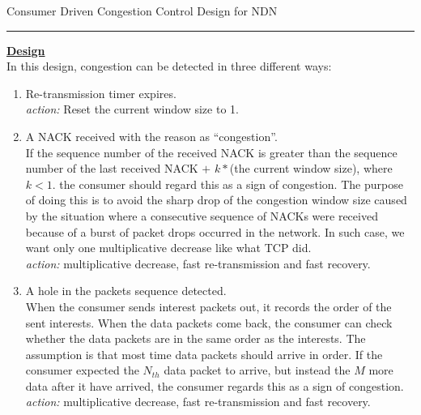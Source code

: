 \documentclass[10pt]{article}
\begin{document}
\noindent


\begin{center}
  Consumer Driven Congestion Control Design for NDN\\
  \vspace{1em}
\end{center}

\hrule\smallskip
\vspace{1em}
\underline{\textbf{Design}}\\

In this design, congestion can be detected in three different ways:
\begin{enumerate}
\item Re-transmission timer expires.\\
  \emph{action:} Reset the current window size to 1.
\item A NACK received with the reason as ``congestion''.\\
  If the sequence number of the received NACK is
  greater than the sequence number of the last received NACK $+$ $k *
  $(the current window size), where $k<1$. the consumer should regard
  this as a sign of 
  congestion. The purpose of doing this is to avoid the sharp drop
  of the congestion window size caused by the situation where a
  consecutive sequence of NACKs were received because of a burst of
  packet drops occurred in the network. In such case, we want
  only one multiplicative decrease like what TCP did.\\
  \emph{action:} multiplicative decrease, fast re-transmission and
  fast recovery.
\item A hole in the packets sequence detected.\\
  When the consumer sends interest packets out, it records the
  order of the sent interests. When the data packets come back, the
  consumer can check whether the data packets are in the same order
  as the interests. The assumption is that most time data packets
  should arrive in order. If the consumer expected the $N_{th}$
  data packet to arrive, but instead the $M$ more data after it have
  arrived, the consumer regards this as a sign of congestion.\\
  \emph{action:} multiplicative decrease, fast re-transmission and
  fast recovery.
\end{enumerate}
\end{document}
